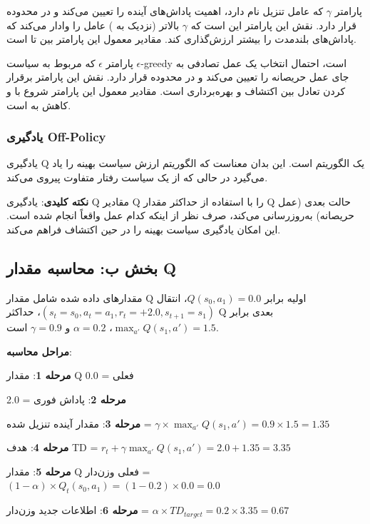 \documentclass{article}
\begin{document}
پارامتر $\gamma$ که عامل تنزیل نام دارد، اهمیت پاداش‌های آینده را تعیین می‌کند و در محدوده \lr{[0, 1]} قرار دارد. نقش این پارامتر این است که $\gamma$ بالاتر (نزدیک به ) عامل را وادار می‌کند که پاداش‌های بلندمدت را بیشتر ارزش‌گذاری کند. مقادیر معمول این پارامتر بین  تا  است.

پارامتر $\epsilon$ که مربوط به سیاست $\epsilon$-greedy است، احتمال انتخاب یک عمل تصادفی به جای عمل حریصانه را تعیین می‌کند و در محدوده \lr{[0, 1]} قرار دارد. نقش این پارامتر برقرار کردن تعادل بین اکتشاف و بهره‌برداری است. مقادیر معمول این پارامتر شروع با  و کاهش به  است.

\subsubsection{یادگیری Off-Policy}

یادگیری Q یک الگوریتم  است. این بدان معناست که الگوریتم ارزش سیاست بهینه را یاد می‌گیرد در حالی که از یک سیاست رفتار متفاوت پیروی می‌کند.

\textbf{نکته کلیدی}: یادگیری Q مقادیر Q را با استفاده از حداکثر مقدار Q حالت بعدی (عمل حریصانه) به‌روزرسانی می‌کند، صرف نظر از اینکه کدام عمل واقعاً انجام شده است. این امکان یادگیری سیاست بهینه را در حین اکتشاف فراهم می‌کند.

\subsection{بخش ب: محاسبه مقدار Q}

مقدارهای داده شده شامل مقدار Q اولیه برابر $Q(s_0, a_1) = 0.0$، انتقال $(s_t = s_0, a_t = a_1, r_t = +2.0, s_{t+1} = s_1)$، حداکثر Q بعدی برابر $\max_{a'} Q(s_1, a') = 1.5$، $\alpha = 0.2$ و $\gamma = 0.9$ است.

\textbf{مراحل محاسبه}:

\textbf{مرحله 1}: مقدار Q فعلی = 0.0

\textbf{مرحله 2}: پاداش فوری = 2.0

\textbf{مرحله 3}: مقدار آینده تنزیل شده = $\gamma \times \max_{a'} Q(s_1, a') = 0.9 \times 1.5 = 1.35$

\textbf{مرحله 4}: هدف TD = $r_t + \gamma \max_{a'} Q(s_1, a') = 2.0 + 1.35 = 3.35$

\textbf{مرحله 5}: مقدار Q فعلی وزن‌دار = $(1 - \alpha) \times Q_t(s_0, a_1) = (1 - 0.2) \times 0.0 = 0.0$

\textbf{مرحله 6}: اطلاعات جدید وزن‌دار = $\alpha \times TD_{target} = 0.2 \times 3.35 = 0.67$
\end{document}
